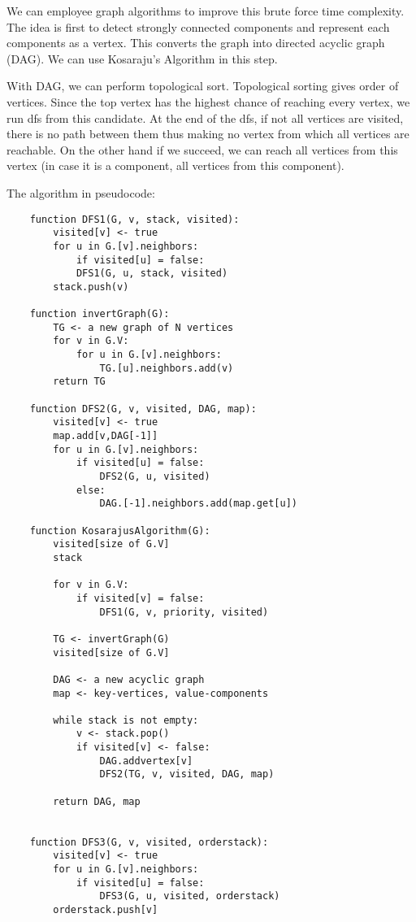 \documentclass{article}
\begin{document}
\begin{enumerate}
  We can employee graph algorithms to improve this brute force time complexity.
  The idea is first to detect strongly connected components and represent each components as a vertex.
  This converts the graph into directed acyclic graph (DAG).
  We can use Kosaraju's Algorithm in this step.

  With DAG, we can perform topological sort.
  Topological sorting gives order of vertices.
  Since the top vertex has the highest chance of reaching every vertex, we run dfs from this candidate.
  At the end of the dfs, if not all vertices are visited, there is no path between them thus making no vertex from which all vertices are reachable.
  On the other hand if we succeed, we can reach all vertices from this vertex (in case it is a component, all vertices from this component).
  
  The algorithm in pseudocode:

  \begin{lstlisting}
    function DFS1(G, v, stack, visited):
        visited[v] <- true
        for u in G.[v].neighbors:
            if visited[u] = false:
            DFS1(G, u, stack, visited)
        stack.push(v)

    function invertGraph(G):
        TG <- a new graph of N vertices
        for v in G.V:
            for u in G.[v].neighbors:
                TG.[u].neighbors.add(v)
        return TG

    function DFS2(G, v, visited, DAG, map):
        visited[v] <- true
        map.add[v,DAG[-1]]
        for u in G.[v].neighbors:
            if visited[u] = false:
                DFS2(G, u, visited)
            else:
                DAG.[-1].neighbors.add(map.get[u])

    function KosarajusAlgorithm(G):
        visited[size of G.V]
        stack

        for v in G.V:
            if visited[v] = false:
                DFS1(G, v, priority, visited)

        TG <- invertGraph(G)
        visited[size of G.V]

        DAG <- a new acyclic graph
        map <- key-vertices, value-components

        while stack is not empty:
            v <- stack.pop()
            if visited[v] <- false:
                DAG.addvertex[v]
                DFS2(TG, v, visited, DAG, map)
        
        return DAG, map
    

    function DFS3(G, v, visited, orderstack):
        visited[v] <- true
        for u in G.[v].neighbors:
            if visited[u] = false:
                DFS3(G, u, visited, orderstack)
        orderstack.push[v]
    

\end{lstlisting}
\end{enumerate}
\end{document}
